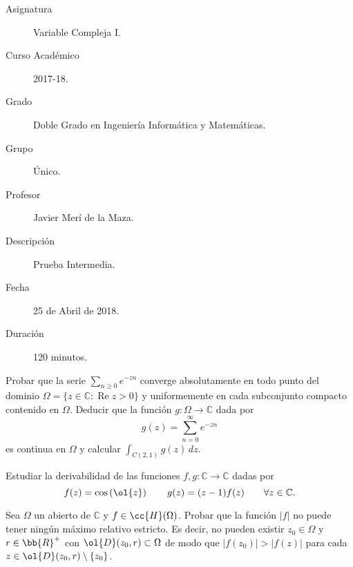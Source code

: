\documentclass[12pt]{article}
\renewcommand{\Re}{\operatorname{Re}} %
\begin{document}

    
    

    \begin{description}
        \item[Asignatura] Variable Compleja I.
        \item[Curso Académico] 2017-18.
        \item[Grado] Doble Grado en Ingeniería Informática y Matemáticas.
        \item[Grupo] Único.
        \item[Profesor] Javier Merí de la Maza.
        \item[Descripción] Prueba Intermedia.
        \item[Fecha] 25 de Abril de 2018.
        \item[Duración] 120 minutos.
    \end{description}
    \newpage

    \begin{ejercicio}[3.5 puntos]
        Probar que la serie $\sum\limits_{n \geq 0} e^{-zn}$ converge absolutamente en todo punto del dominio $\Omega = \{z \in \mathbb{C} : \Re z > 0\}$ y uniformemente en cada subconjunto compacto contenido en $\Omega$. Deducir que la función $g : \Omega \to \mathbb{C}$ dada por
        \[
            g(z) = \sum\limits_{n=0}^{\infty} e^{-zn}
        \]
        es continua en $\Omega$ y calcular $\displaystyle \int_{C(2,1)} g(z) \, dz$.
    \end{ejercicio}

    \begin{ejercicio}[3.5 puntos]
        Estudiar la derivabilidad de las funciones $f , g : \mathbb{C} \to \mathbb{C}$ dadas por
        \[
            f(z) = \cos\left(\ol{z}\right)\qquad g(z) = (z - 1) f(z)\qquad \forall z \in \mathbb{C}.
        \]
    \end{ejercicio}

    \begin{ejercicio}[3 puntos]
        Sea $\Omega$ un abierto de $\mathbb{C}$ y $f \in \cc{H} (\Omega)$. Probar que la función $|f|$ no puede tener ningún máximo relativo estricto. Es decir, no pueden existir $z_0 \in \Omega$ y $r\in \bb{R}^+$ con $\ol{D}(z_0 , r) \subset \Omega$ de modo que $|f(z_0 )| > |f(z)|$ para cada $z \in \ol{D}(z_0 , r) \setminus \{z_0\}$.
    \end{ejercicio}
\end{document}
